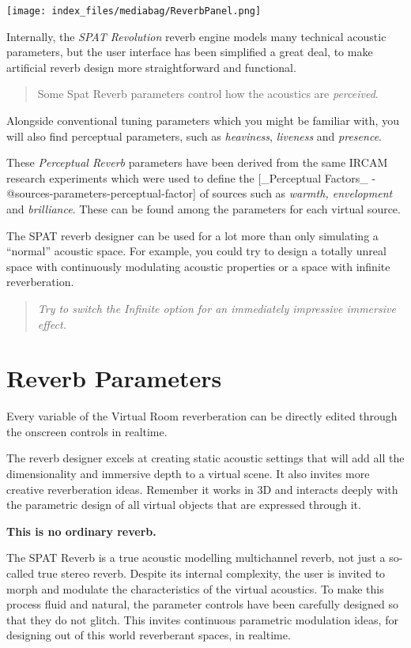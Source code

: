 \documentclass[
  letterpaper,
  DIV=11,
  numbers=noendperiod]{scrreport}
\begin{document}
\texttt{[image: index\_files/mediabag/ReverbPanel.png]}

Internally, the \emph{SPAT Revolution} reverb engine models many
technical acoustic parameters, but the user interface has been
simplified a great deal, to make artificial reverb design more
straightforward and functional.

\begin{quote}
Some Spat Reverb parameters control how the acoustics are
\emph{perceived}.
\end{quote}

Alongside conventional tuning parameters which you might be familiar
with, you will also find perceptual parameters, such as
\emph{heaviness}, \emph{liveness} and \emph{presence}.

These \emph{Perceptual Reverb} parameters have been derived from the
same IRCAM research experiments which were used to define the
{[}\_Perceptual Factors\_ -@sources-parameters-perceptual-factor{]} of
sources such as \emph{warmth, envelopment} and \emph{brilliance}. These
can be found among the parameters for each virtual source.

The SPAT reverb designer can be used for a lot more than only simulating
a ``normal'' acoustic space. For example, you could try to design a
totally unreal space with continuously modulating acoustic properties or
a space with infinite reverberation.

\begin{quote}
\emph{Try to switch the Infinite option for an immediately impressive
immersive effect.}
\end{quote}

\hypertarget{reverb-parameters}{%
\chapter{Reverb Parameters}\label{reverb-parameters}}

Every variable of the Virtual Room reverberation can be directly edited
through the onscreen controls in realtime.

The reverb designer excels at creating static acoustic settings that
will add all the dimensionality and immersive depth to a virtual scene.
It also invites more creative reverberation ideas. Remember it works in
3D and interacts deeply with the parametric design of all virtual
objects that are expressed through it.

\textbf{This is no ordinary reverb.}

The SPAT Reverb is a true acoustic modelling multichannel reverb, not
just a so-called true stereo reverb. Despite its internal complexity,
the user is invited to morph and modulate the characteristics of the
virtual acoustics. To make this process fluid and natural, the parameter
controls have been carefully designed so that they do not glitch. This
invites continuous parametric modulation ideas, for designing out of
this world reverberant spaces, in realtime.
\end{document}
